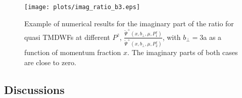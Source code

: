 \documentclass[prd,aps,twocolumn,preprintnumbers, showpacs, nofootinbib,superscriptaddress,notitlepage]{revtex4-1}
\newcommand\bl{\color{blue}}
\begin{document}




\begin{figure}
\centering
\texttt{[image: plots/imag\_ratio\_b3.eps]}
\caption{{\bl Example of numerical results for} the imaginary part of the ratio for quasi TMDWFs at different $P^z$, $\frac{\tilde{\Psi}^+(x,b_{\perp},\mu,P_1^z)}{\tilde{\Psi}^+(x,b_{\perp},\mu,P_2^z)}$, with $b_{\perp}=3$a as a function of momentum fraction $x$. The imaginary parts of both cases are close to zero.}
    \label{fig:ratio_phi}
\end{figure}


\subsection{Discussions}
\end{document}
